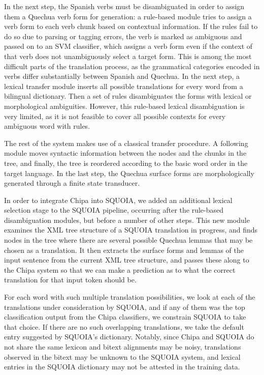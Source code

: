 In the next step, the Spanish verbs must be disambiguated in order to assign
them a Quechua verb form for generation: a rule-based module tries to assign a
verb form to each verb chunk based on contextual information. If the rules fail to
do so due to parsing or tagging errors, the verb is marked as ambiguous and
passed on to an SVM classifier, which assigns a verb form even if the context
of that verb does not unambiguously select a target form. This is among the
most difficult parts of the
translation process, as the grammatical categories encoded in verbs differ
substantially between Spanish and Quechua. In the next step, a lexical transfer
module inserts all possible translations for every word from a bilingual dictionary.
Then a set of rules disambiguates the forms with lexical or morphological
ambiguities. However, this rule-based lexical disambiguation is very limited,
as it is not feasible to cover all possible contexts for every ambiguous word
with rules.

The rest of the system makes use of a classical transfer procedure. A following module
moves syntactic information between the nodes and the chunks in the tree, and
finally, the tree is reordered according to the basic word order in the target
language. In the last step, the Quechua surface forms are morphologically
generated through a finite state transducer.

In order to integrate Chipa into SQUOIA, we added an additional lexical
selection stage to the SQUOIA pipeline, occurring after the rule-based
disambiguation modules, but before a number of other steps. This new module
examines the XML tree structure of a SQUOIA translation in progress, and finds
nodes in the tree where there are several possible Quechua lemmas that may be
chosen as a translation. It then extracts the surface forms and lemmas of the
input sentence from the current XML tree structure, and passes these along to
the Chipa system so that we can make a prediction as to what the correct
translation for that input token should be.

For each word with such multiple translation possibilities, we look at each of
the translations under consideration by SQUOIA, and if any of them was the top 
classification output from the Chipa classifiers, we constrain SQUOIA to take
that choice.
If there are no such overlapping translations, we
take the default entry suggested by SQUOIA's dictionary.
Notably, since Chipa and SQUOIA do not share the same lexicon and bitext alignments
may be noisy, translations
observed in the bitext may be unknown to the SQUOIA system, and lexical entries in the
SQUOIA dictionary may not be attested in the training data.

